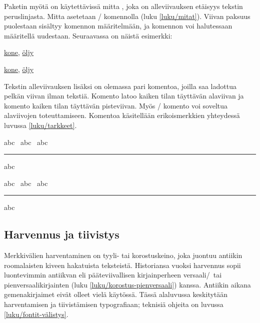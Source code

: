 \begin{koodilohkosis}
\usepackage[normalem]{ulem}
\end{koodilohkosis}

\noindent
Paketin  myötä on käytettävissä mitta ,
joka on alleviivauksen etäisyys tekstin peruslinjasta. Mitta asetetaan
\-/ komennolla (luku \ref{luku/mitat}). Viivan
paksuus puolestaan sisältyy komennon  määritelmään,
ja komennon voi halutessaan määritellä uudestaan. Seuraavassa on näistä
esimerkki:

\begin{koodilohkosis}
\setlength{\ULdepth}{.2ex}        %
\renewcommand{\ULthickness}{.1ex} %
\uline{kone}, \uline{öljy}
\end{koodilohkosis}

\begin{tulossis}
  \setlength{\ULdepth}{.2ex}
  \renewcommand{\ULthickness}{.1ex}
  \uline{kone}, \uline{öljy}
\end{tulossis}

\noindent
Tekstin alleviivauksen lisäksi on olemassa pari komentoa, joilla saa
ladottua pelkän viivan ilman tekstiä. Komento  latoo
kaiken tilan täyttävän alaviivan ja komento  kaiken
tilan täyttävän pisteviivan. Myös \-/ komento voi soveltua
alaviivojen toteuttamiseen. Komentoa käsitellään erikoismerkkien
yhteydessä luvussa \ref{luku/tarkkeet}.

\begin{koodilohkosis}
abc \hrulefill\ abc \dotfill\ abc \rule[-.3ex]{5em}{.4bp} abc
\end{koodilohkosis}

\begin{tulossis}
  abc \hrulefill\ abc \dotfill\ abc \rule[-.3ex]{5em}{.4bp} abc
\end{tulossis}

\subsection{Harvennus ja tiivistys}
\label{luku/korostus-harvennus}

Merkkivälien harventaminen on tyyli- tai korostuskeino, joka juontuu
antiikin roomalaisten kiveen hakatuista teksteistä. Historiansa vuoksi
harvennus sopii luontevimmin antiikvan eli pääteviivallisen
kirjainperheen versaali\-/\ tai pienversaalikirjainten (luku
\ref{luku/korostus-pienversaali}) kanssa. Antiikin aikana
gemenakirjaimet eivät olleet vielä käytössä. Tässä alaluvussa
keskitytään harventamisen ja tiivistämisen typografiaan; teknisiä
ohjeita on luvussa \ref{luku/fontit-välistys}.

